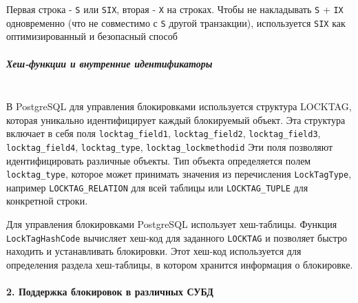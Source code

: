  Первая строка - \texttt{S} или \texttt{SIX}, вторая - \texttt{X} на строках. 
Чтобы не накладывать \texttt{S} + \texttt{IX} одновременно (что не совместимо с \texttt{S} другой транзакции), используется \texttt{SIX} как оптимизированный и безопасный способ

\subparagraph{Хеш-функции и внутренние идентификаторы} ~\\

 В PostgreSQL для управления блокировками используется структура LOCKTAG, которая уникально идентифицирует каждый блокируемый объект. Эта структура включает в себя поля \texttt{locktag\_field1}, \texttt{locktag\_field2}, \texttt{locktag\_field3}, \texttt{locktag\_field4}, \texttt{locktag\_type}, \texttt{locktag\_lockmethodid} \autocite{PostgreSQLlockh1, PostgreSQLlockh2}
 Эти поля позволяют идентифицировать различные объекты. Тип объекта определяется полем \texttt{locktag\_type}, которое может принимать значения из перечисления \texttt{LockTagType}, например \texttt{LOCKTAG\_RELATION} для всей таблицы или \texttt{LOCKTAG\_TUPLE} для конкретной строки.
 
 Для управления блокировками PostgreSQL использует хеш-таблицы. Функция \texttt{LockTagHashCode} вычисляет хеш-код для заданного \texttt{LOCKTAG} и позволяет быстро находить и устанавливать блокировки. Этот хеш-код используется для определения раздела хеш-таблицы, в котором хранится информация о блокировке. \autocite{PostgreSQLlockc1, PostgreSQLlockc2}

\paragraph{2. Поддержка блокировок в различных СУБД} ~\\

